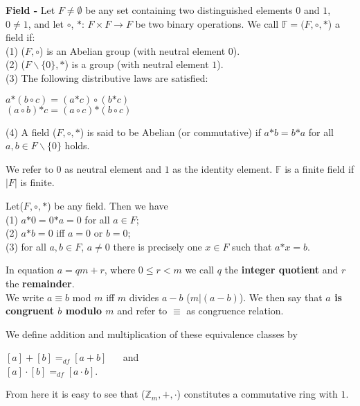 \documentclass[a4paper]{article}
\begin{document}
\begin{definition}
\textbf{Field -} Let $F \neq \emptyset$ be any set containing two distinguished elements $0$ and $1$, $0 \neq 1$, and let $\circ$, $\mathcal{*}$: $F \times F \to F$ be two binary operations. We call $\mathbb{F} = (F, \circ, \mathcal{*}$) a field if:\\
(1) ($F, \circ$) is an Abelian group (with neutral element $0$).\\
(2) ($F \backslash \{0\}, \mathcal{*}$) is a group (with neutral element $1$).\\
(3) The following distributive laws are satisfied:
\begin{center}
$a \mathcal{*} (b \circ c) = (a \mathcal{*} c) \circ (b \mathcal{*} c)$\\
$(a \circ b) \mathcal{*} c = (a \circ c) \mathcal{*} (b \circ c)$
\end{center}
(4) A field ($F, \circ, \mathcal{*}$) is said to be Abelian (or commutative) if $a \mathcal{*} b = b \mathcal{*} a$ for all $a, b \in F \backslash \{0\}$ holds.
\end{definition}
We refer to $0$ as neutral element and $1$ as the identity element. $\mathbb{F}$ is a finite field if $|F|$ is finite.


\begin{theorem}
Let($F, \circ, \mathcal{*}$) be any field. Then we have\\
(1) $a \mathcal{*} 0 = 0 \mathcal{*} a = 0$ for all $a \in F$;\\
(2) $a \mathcal{*} b = 0$ iff $a = 0$ or $b = 0$;\\
(3) for all $a, b \in F$, $a \neq 0$ there is precisely one $x \in F$ such that $a \mathcal{*} x = b$.
\end{theorem}


In equation $a = qm + r$, where $0 \leq r < m$ we call $q$ the \textbf{integer quotient} and $r$ the \textbf{remainder}.\\
We write $a \equiv b$ mod $m$ iff $m$ divides $a -b$ ($m|(a-b)$). We then say that \textbf{$a$ is congruent $b$ modulo $m$} and refer to $\equiv$ as congruence relation.
\begin{definition}
We define addition and multiplication of these equivalence classes by\\
\begin{center}
$[a] + [b] =_{df} [a+b]$ $\quad$ and\\
$[a] \cdot [b] =_{df} [a \cdot b]$. $\qquad$
\end{center}
\end{definition}
From here it is easy to see that ($\mathbb{Z}_{m}, +, \cdot$) constitutes a commutative ring with $1$.
\end{document}

